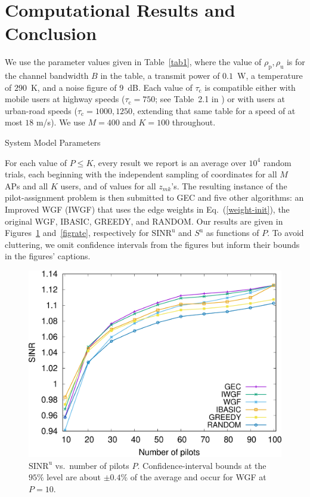 \documentclass[]{IEEEtran}
\begin{document}
\section{Computational Results and Conclusion}
\label{rslt}

We use the parameter values given in Table~\ref{tab1}, where the value of
$\rho_\mathrm{p},\rho_\mathrm{u}$ is for the channel bandwidth $B$ in the table,
a transmit power of $0.1$~W, a temperature of $290$~K, and a noise figure of
$9$~dB. Each value of $\tau_\mathrm{c}$ is compatible either with mobile users
at highway speeds ($\tau_\mathrm{c}=750$; see Table~2.1 in \cite{mlyn16}) or
with users at urban-road speeds ($\tau_\mathrm{c}=1000,1250$, extending that
same table for a speed of at most $18$ m/s). We use $M=400$ and $K=100$
throughout.

\begin{table}[t] 
\caption{System Model Parameters}
\label{tab1}
\centering

\end{table}

For each value of $P\le K$, every result we report is an average over $10^4$
random trials, each beginning with the independent sampling of coordinates for
all $M$ APs and all $K$ users, and of values for all $z_{mk}$'s. The resulting
instance of the pilot-assignment problem is then submitted to GEC and five other
algorithms: an Improved WGF (IWGF) that uses the edge weights in
Eq.~(\ref{weight-init}), the original WGF, IBASIC, GREEDY, and RANDOM. Our
results are given in Figures~\ref{figsinr} and~\ref{figrate}, respectively for
$\mathrm{SINR^u}$ and $S^\mathrm{u}$ as functions of $P$. To avoid cluttering,
we omit confidence intervals from the figures but inform their bounds in the
figures' captions.

\begin{figure}[t]
\centering
\includegraphics[scale=0.6915]{sinr.png}
\caption{$\mathrm{SINR}^\mathrm{u}$ vs.\ number of pilots $P$.
Confidence-interval bounds at the $95\%$ level are about $\pm 0.4\%$ of the
average and occur for WGF at $P=10$.}
\label{figsinr}
\end{figure}
\end{document}
